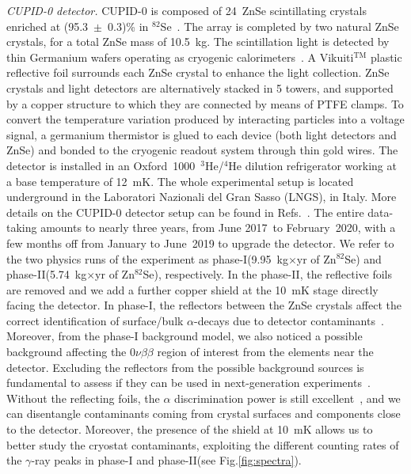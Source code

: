 \documentclass[%
reprint,
superscriptaddress,
altaffilletter,
showpacs,
showkeys,
amsmath, amssymb, aps,prl, floatfix,
]{revtex4-1}
\newcommand{\startDAQ}{June 2017}
\newcommand{\ZS}{Zn$^{82}$Se\xspace}
\newcommand{\onu}{$0\nu\beta \beta$\xspace}
\newcommand{\phone}{phase-I\xspace}
\newcommand{\phtwo}{phase-II\xspace}
\begin{document}
{\it CUPID-0 detector.} CUPID-0 is composed of 24~ZnSe scintillating crystals~\cite{Dafinei:2017xpc} enriched at (95.3~$\pm$~0.3)\% in $^{82}$Se~\cite{Balabanov:2023tnj}.
The array is completed by two natural ZnSe crystals, for a total ZnSe mass of 10.5~kg. 
The scintillation light is detected by thin Germanium wafers operating as cryogenic calorimeters~\cite{Beeman:2013zva}.
A Vikuiti$^{\text{TM}}$ plastic reflective foil surrounds each ZnSe crystal to enhance the light collection. 
ZnSe crystals and light detectors are alternatively stacked in 5 towers, and supported by a copper structure to which they are connected by means of PTFE clamps. 
To convert the temperature variation produced by interacting particles into a voltage signal, a germanium thermistor is glued to each device (both light detectors and ZnSe) and bonded to the cryogenic readout system through thin gold wires. 
The detector is installed in an Oxford~1000~$^3$He/$^4$He dilution refrigerator working at a base temperature of 12~mK. The whole experimental setup is located underground in the Laboratori Nazionali del Gran Sasso (LNGS), in Italy. 
More details on the CUPID-0 detector setup can be found in Refs.~\cite{Azzolini:2018tum,Carniti:2017zkr,Arnaboldi:2015wvc,Arnaboldi:2017aek}. The entire data-taking amounts to nearly three years, from \startDAQ~to February~2020, with a few months off from January to June~2019 to upgrade the detector. We refer to the two physics runs of the experiment as \phone (9.95~kg$\times$yr of \ZS) and \phtwo (5.74~kg$\times$yr of \ZS), respectively.
In the \phtwo, the reflective foils are removed and we add a further copper shield at the 10~mK stage directly facing the detector. In \phone, the reflectors between the ZnSe crystals affect the correct identification of surface/bulk $\alpha$-decays due to detector contaminants~\cite{Azzolini:2021yft}. Moreover, from the \phone background model, we also noticed a possible background affecting the \onu region of interest from the elements near the detector. 
Excluding the reflectors from the possible background sources is fundamental to assess if they can be used in next-generation experiments~\cite{CUPID:2020itw}.
Without the reflecting foils, the $\alpha$ discrimination power is still excellent~\cite{CUPID:2022puj}, and we can disentangle contaminants coming from crystal surfaces and components close to the detector. 
Moreover, the presence of the shield at 10~mK allows us to better study the cryostat contaminants, exploiting the different counting rates of the $\gamma$-ray peaks in \phone and \phtwo (see Fig.\ref{fig:spectra}).
\end{document}
